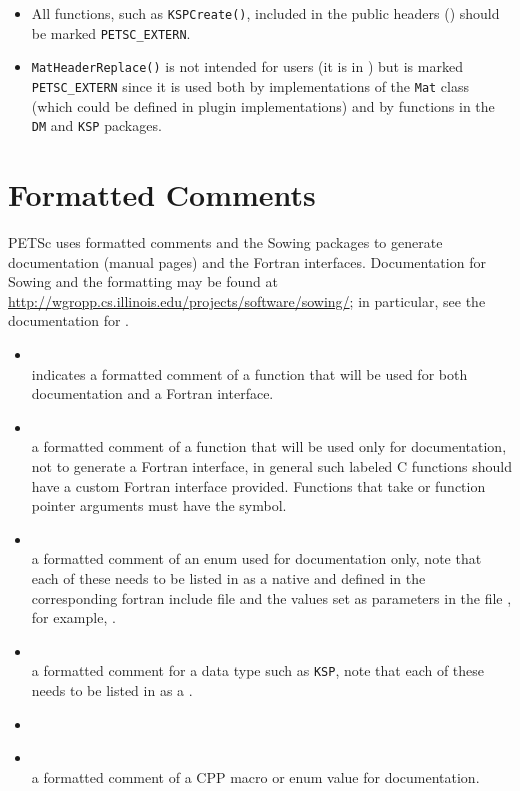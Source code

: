 \begin{enumerate}
\begin{itemize}
\item All functions, such as \lstinline{KSPCreate()}, included in the public headers () should be marked \lstinline{PETSC_EXTERN}.
\item \lstinline{MatHeaderReplace()} is not intended for users (it is in ) but is marked \lstinline{PETSC_EXTERN} since it is used both by implementations of the \lstinline{Mat} class (which could be defined in plugin implementations) and by functions in the \lstinline{DM} and \lstinline{KSP} packages.
\end{itemize}
\end{enumerate}

\section{Formatted Comments}

PETSc uses formatted comments and the Sowing packages \cite{gropp1993sowing,gropp1993sowing2} to generate documentation (manual pages) and the Fortran interfaces. 
Documentation for Sowing and the formatting may be found at \href{http://wgropp.cs.illinois.edu/projects/software/sowing/}{http://wgropp.cs.illinois.edu/projects/software/sowing/}; in particular, see the documentation for .

\begin{itemize}
    \item
      \\      indicates a formatted comment of a function that will be used for
        both documentation and a Fortran interface.
    \item
      \\    a formatted comment of a function that will be used only for
        documentation, not to generate a Fortran interface, in general such labeled C functions should have a custom Fortran interface provided. Functions that take  or function pointer arguments must have the  symbol. 
    \item
      \\     a formatted comment of an enum used for documentation only, note that
        each of these needs to be listed in  as
        a native and defined in the corresponding
         fortran include file and the values
        set as parameters in the file , for example, .
    \item
      \\     a formatted comment for a data type such as \lstinline{KSP}, note that each of these
        needs to be listed in  as a .
    \item
    \item
      \\    a formatted comment of a CPP macro or enum value for documentation.
\end{itemize}

